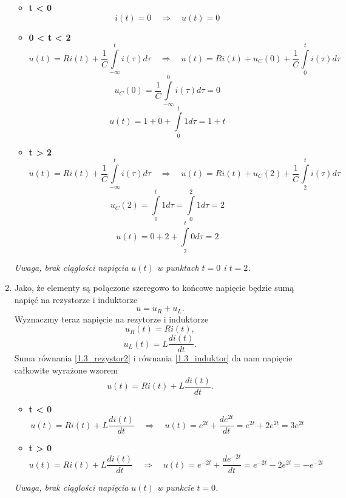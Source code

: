 \documentclass[12pt, a4paper]{article}
\begin{document}
\begin{enumerate}[label=\alph*)]
        \begin{itemize}
          \item \textbf{t < 0}
                $$
                  i(t) = 0 \quad \Rightarrow \quad u(t) = 0
                $$
          \item \textbf{0 < t < 2}
                $$
                  u(t) = Ri(t) + \frac{1}{C}\int\limits_{-\infty}^t i(\tau) d\tau
                  \quad \Rightarrow \quad
                  u(t) = Ri(t) + u_C(0)+\frac{1}{C}\int\limits_0^t i(\tau) d\tau
                $$
                $$
                  u_C(0) = \frac{1}{C}\int\limits_{-\infty}^0 i(\tau) d\tau = 0
                $$
                $$
                  u(t) = 1 + 0 +\int\limits_{0}^t 1 d\tau =  1+t
                $$
          \item \textbf{t > 2}
                $$
                  u(t) = Ri(t) + \frac{1}{C}\int\limits_{-\infty}^t i(\tau) d\tau
                  \quad \Rightarrow \quad
                  u(t) = Ri(t) + u_C(2)+\frac{1}{C}\int\limits_2^t i(\tau) d\tau
                $$
                $$
                  u_C(2) = \int\limits_{0}^t 1 d\tau = \int\limits_{0}^2 1 d\tau = 2
                $$
                $$
                  u(t) = 0 + 2 +\int\limits_{2}^t 0 d\tau =  2
                $$
        \end{itemize}
        \textit{Uwaga, brak ciągłości napięcia $u(t)$ w punktach $t=0$ i $t=2$.}
  \item Jako, że elementy są połączone szeregowo to końcowe napięcie będzie
        sumą napięć na rezystorze i induktorze
        $$
          u = u_R + u_L.
        $$
        Wyznaczmy teraz napięcie na rezytorze i induktorze
        \begin{equation}\label{1.3_rezystor2}
          u_R(t) = Ri(t),
        \end{equation}
        \begin{equation}\label{1.3_induktor}
          u_L(t) = L\frac{di(t)}{dt}.
        \end{equation}
        Suma równania \ref{1.3_rezystor2} i  równania \ref{1.3_induktor}
        da nam napięcie całkowite wyrażone wzorem
        \begin{equation}\label{1.3_napiecie2}
          u(t) = Ri(t) + L\frac{di(t)}{dt}.
        \end{equation}

        \begin{itemize}
          \item \textbf{t < 0}
                $$
                  u(t) = Ri(t) + L\frac{di(t)}{dt}
                  \quad \Rightarrow \quad
                  u(t) = e^{2t}+\frac{de^{2t}}{dt} = e^{2t} + 2e^{2t} = 3e^{2t}
                $$
          \item \textbf{t > 0}
                $$
                  u(t) = Ri(t) + L\frac{di(t)}{dt}
                  \quad \Rightarrow \quad
                  u(t) = e^{-2t}+\frac{de^{-2t}}{dt} = e^{-2t} - 2e^{2t} = -e^{-2t}
                $$
        \end{itemize}
        \textit{Uwaga, brak ciągłości napięcia $u(t)$ w punkcie $t=0$.}
\end{enumerate}
\end{document}
